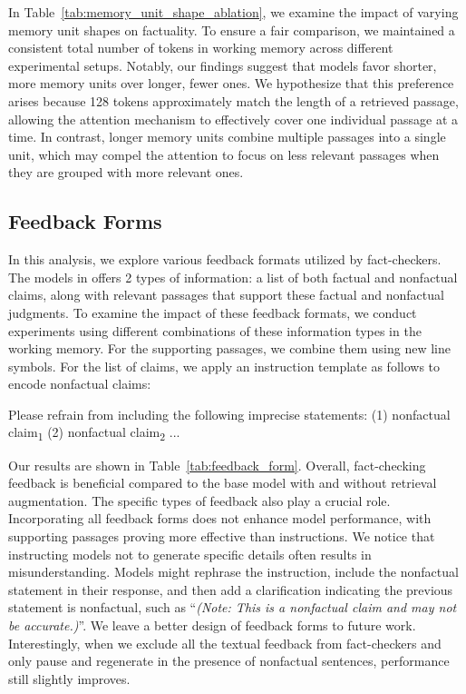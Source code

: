 

In Table~\ref{tab:memory_unit_shape_ablation}, we examine the impact of varying memory unit shapes on factuality. To ensure a fair comparison, we maintained a consistent total number of tokens in working memory across different experimental setups. 
Notably, our findings suggest that models favor shorter, more memory units over longer, fewer ones. We hypothesize that this preference arises because 128 tokens approximately match the length of a retrieved passage, allowing the attention mechanism to effectively cover one individual passage at a time. 
In contrast, longer memory units combine multiple passages into a single unit, which may compel the attention to focus on less relevant passages when they are grouped with more relevant ones.



\subsection{Feedback Forms}






In this analysis, we explore various feedback formats utilized by fact-checkers. The models in \vs offers 2 types of information: a list of both factual and nonfactual claims, along with relevant passages that support these factual and nonfactual judgments. To examine the impact of these feedback formats, we conduct experiments using different combinations of these information types in the working memory. For the supporting passages, we combine them using new line symbols. For the list of claims, we apply an instruction template as follows to encode nonfactual claims:
\begin{TextBox}{}
{Please refrain from including the following imprecise statements: (1) nonfactual claim\textsubscript{1} (2) nonfactual claim\textsubscript{2} ...}
\end{TextBox}

Our results are shown in Table~\ref{tab:feedback_form}. Overall, fact-checking feedback is beneficial compared to the base model with and without retrieval augmentation. 
The specific types of feedback also play a crucial role. Incorporating all feedback forms does not enhance model performance, with supporting passages proving more effective than instructions. 
We notice that instructing models not to generate specific details often results in misunderstanding. Models might rephrase the instruction, include the nonfactual statement in their response, and then add a clarification indicating the previous statement is nonfactual, such as ``\textit{(Note: This is a nonfactual claim and may not be accurate.)}''. We leave a better design of feedback forms to future work. 
Interestingly, when we exclude all the textual feedback from fact-checkers and only pause and regenerate in the presence of nonfactual sentences, performance still slightly improves.


